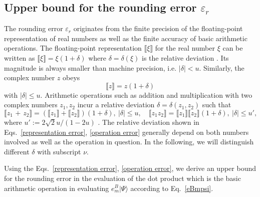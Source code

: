 \documentclass[letterpaper,10pt]{iopart}
\newcommand{\dket}[1]{|#1\rangle}
\begin{document}
\subsection{Upper bound for the rounding error $\varepsilon_r$}
\label{rounding error upper bound}
The rounding error $\varepsilon_r$ originates from the finite precision of the floating-point representation of real numbers as well as the finite accuracy of basic arithmetic operations. The floating-point representation  $\llbracket \xi \rrbracket$ for the real number $\xi $ can be written as $\llbracket \xi \rrbracket=\xi(1+\delta)$ where $\delta=\delta(\xi)$ is the relative deviation \cite{higham2002accuracy}. Its magnitude is always smaller than machine precision, i.e. $|\delta|<u$. Similarly, the complex number $z$ obeys 
\begin{equation}
    \label{representation error}
    \llbracket z\rrbracket=z(1+\delta)
\end{equation}
with $|\delta|\leq u$. Arithmetic operations such as addition and multiplication with two complex numbers $z_1, z_2$ incur a relative deviation $\delta=\delta(z_1,z_2)$ such that 
\begin{equation}
\label{operation error}
    \llbracket z_1 \text{ + } z_2\rrbracket =(\llbracket z_1 \rrbracket+\llbracket z_2\rrbracket)(1+\delta),\ |\delta|\leq u, \quad\llbracket z_1 z_2 \rrbracket=\llbracket z_1\rrbracket \llbracket z_2\rrbracket(1+\delta),\ |\delta|\leq u',
\end{equation}
where $u':=2\sqrt{2}u/(1-2u)$ \cite{higham2002accuracy}. The relative deviation shown in Eqs.\ \eqref{representation error}, \eqref{operation error} generally depend on both numbers involved as well as the operation in question. In the following, we will distinguish different $\delta$ with subscript $\nu$.

Using the Eqs.\ \eqref{representation error}, \eqref{operation error}, we derive an upper bound for the rounding error in the evaluation of the dot product which is the basic arithmetic operation in evaluating $e^B_m\dket{\Psi}$ according to Eq.\ \eqref{eBmpsi}.
\end{document}
